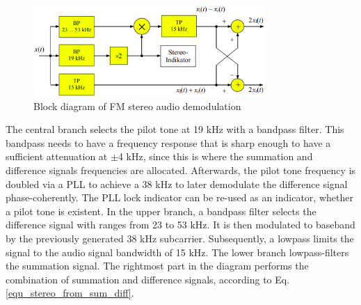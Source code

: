   \begin{figure}[!h]
    \centering
      \includegraphics[width=8.8cm]{img/fm-demod-stereo-audio.png}
    \caption{Block diagram of FM stereo audio demodulation \cite{ref_roppel}}
    \label{fig_bd_stereo_demod}
  \end{figure}

  The central branch selects the pilot tone at 19 kHz with a bandpass filter.
  This bandpass needs to have a frequency response that is sharp enough to have a sufficient attenuation at $\pm$4 kHz, since this is where the summation and difference signals frequencies are allocated.
  Afterwards, the pilot tone frequency is doubled via a PLL to achieve a 38 kHz to later demodulate the difference signal phase-coherently.
  The PLL lock indicator can be re-used as an indicator, whether a pilot tone is existent.
  In the upper branch, a bandpass filter selects the difference signal with ranges from 23 to 53 kHz.
  It is then modulated to baseband by the previously generated 38 kHz subcarrier.
  Subsequently, a lowpass limits the signal to the audio signal bandwidth of 15 kHz.
  The lower branch lowpass-filters the summation signal.
  The rightmost part in the diagram performs the combination of summation and difference signals, according to Eq.\ref{equ_stereo_from_sum_diff}.

